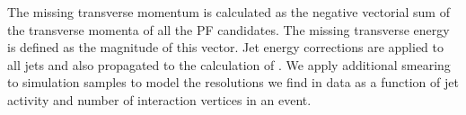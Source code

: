The missing transverse momentum is calculated as the negative vectorial sum of the transverse momenta of all the PF candidates. The missing transverse energy \MET is defined as the magnitude of this vector. Jet energy corrections are applied to all jets and also propagated to the calculation of \MET \cite{CMS-PAS-JME-12-002}. We apply additional smearing to simulation samples to model the \MET resolutions we find in data as a function of jet activity and number of interaction vertices in an event.
